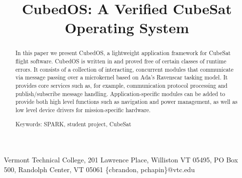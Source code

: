 \documentclass{AUJarticle}
\begin{document}
\title{CubedOS: A Verified CubeSat Operating System}

{Vermont Technical College, 201 Lawrence Place, Williston VT 05495, PO Box 500, Randolph Center, VT 05061}
  {\{cbrandon, pchapin\}@vtc.edu}



\thispagestyle{plain}

\maketitle

\begin{abstract}
  In this paper we present CubedOS, a lightweight application framework for CubeSat flight
  software. CubedOS is written in \SPARK and proved free of certain classes of runtime errors.
  It consists of a collection of interacting, concurrent modules that communicate via message
  passing over a microkernel based on Ada's Ravenscar tasking model. It provides core services
  such as, for example, communication protocol processing and publish/subscribe message
  handling. Application-specific modules can be added to provide both high level functions such
  as navigation and power management, as well as low level device drivers for mission-specific
  hardware.

  Keywords: SPARK, student project, CubeSat
\end{abstract}









\balance
\end{document}
